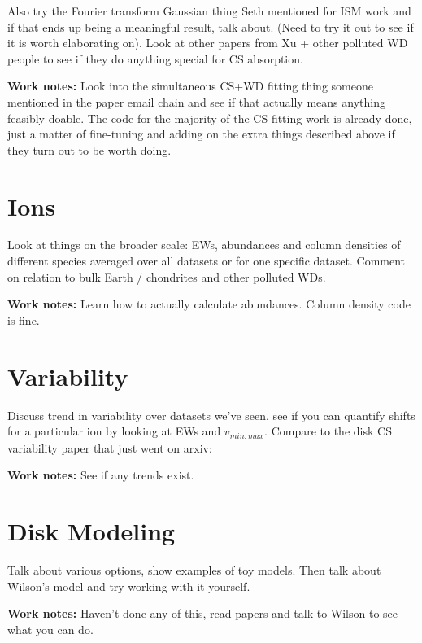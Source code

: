 Also try the Fourier transform Gaussian thing Seth mentioned for ISM work and if that ends up being a meaningful result, talk about. (Need to try it out to see if it is worth elaborating on). Look at other papers from Xu + other polluted WD people to see if they do anything special for CS absorption.

\textbf{Work notes:} Look into the simultaneous CS+WD fitting thing someone mentioned in the paper email chain and see if that actually means anything feasibly doable. The code for the majority of the CS fitting work is already done, just a matter of fine-tuning and adding on the extra things described above if they turn out to be worth doing.



\section{Ions}
\label{spectra_ions}
Look at things on the broader scale: EWs, abundances and column densities of different species averaged over all datasets or for one specific dataset. Comment on relation to bulk Earth / chondrites and other polluted WDs.

\textbf{Work notes:} Learn how to actually calculate abundances. Column density code is fine.

\section{Variability}
\label{spectra_variability}
Discuss trend in variability over datasets we've seen, see if you can quantify shifts for a particular ion by looking at EWs and $v_{min,max}$. Compare to the disk CS variability paper that just went on arxiv: \cite{Manser2016}

\textbf{Work notes:} See if any trends exist. 

\section{Disk Modeling}
\label{spectra_modeling}
Talk about various options, show examples of toy models. Then talk about Wilson's model and try working with it yourself. 

\textbf{Work notes:} Haven't done any of this, read papers and talk to Wilson to see what you can do.


